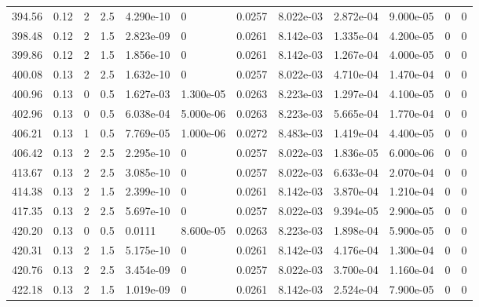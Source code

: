 \documentclass[preview]{standalone}
\begin{document}
{{{\begin{tabular}{L{1.2cm}C{1.2cm} C{0.3cm}C{0.5cm} C{1.4cm}C{1.4cm} C{1.4cm}C{1.4cm} C{1.6cm}C{1.6cm} C{1.6cm}C{1.6cm}}
  394.56  &  0.12  & 2     & 2.5 &  4.290e-10  & 0  &  0.0257&   8.022e-03& 2.872e-04 & 9.000e-05   &  0 & 0  \\ 
  398.48  &  0.12  & 2     & 1.5 &  2.823e-09  & 0  &  0.0261&   8.142e-03& 1.335e-04 & 4.200e-05   &  0 & 0  \\ 
  399.86  &  0.12  & 2     & 1.5 &  1.856e-10  & 0  &  0.0261&   8.142e-03& 1.267e-04 & 4.000e-05   &  0 & 0  \\ 
  400.08  &  0.13  & 2     & 2.5 &  1.632e-10  & 0  &  0.0257&   8.022e-03& 4.710e-04 & 1.470e-04   &  0 & 0  \\ 
  400.96  &  0.13  & 0     & 0.5 &  1.627e-03  & 1.300e-05  &  0.0263&   8.223e-03& 1.297e-04 & 4.100e-05   &  0 & 0  \\ 
  402.96  &  0.13  & 0     & 0.5 &  6.038e-04  & 5.000e-06  &  0.0263&   8.223e-03& 5.665e-04 & 1.770e-04   &  0 & 0  \\ 
  406.21  &  0.13  & 1     & 0.5 &  7.769e-05  & 1.000e-06  &  0.0272&   8.483e-03& 1.419e-04 & 4.400e-05   &  0 & 0  \\ 
  406.42  &  0.13  & 2     & 2.5 &  2.295e-10  & 0  &  0.0257&   8.022e-03& 1.836e-05 & 6.000e-06   &  0 & 0  \\ 
  413.67  &  0.13  & 2     & 2.5 &  3.085e-10  & 0  &  0.0257&   8.022e-03& 6.633e-04 & 2.070e-04   &  0 & 0  \\ 
  414.38  &  0.13  & 2     & 1.5 &  2.399e-10  & 0  &  0.0261&   8.142e-03& 3.870e-04 & 1.210e-04   &  0 & 0  \\ 
  417.35  &  0.13  & 2     & 2.5 &  5.697e-10  & 0  &  0.0257&   8.022e-03& 9.394e-05 & 2.900e-05   &  0 & 0  \\ 
  420.20  &  0.13  & 0     & 0.5 &  0.0111  & 8.600e-05  &  0.0263&   8.223e-03& 1.898e-04 & 5.900e-05   &  0 & 0  \\ 
  420.31  &  0.13  & 2     & 1.5 &  5.175e-10  & 0  &  0.0261&   8.142e-03& 4.176e-04 & 1.300e-04   &  0 & 0  \\ 
  420.76  &  0.13  & 2     & 2.5 &  3.454e-09  & 0  &  0.0257&   8.022e-03& 3.700e-04 & 1.160e-04   &  0 & 0  \\ 
  422.18  &  0.13  & 2     & 1.5 &  1.019e-09  & 0  &  0.0261&   8.142e-03& 2.524e-04 & 7.900e-05   &  0 & 0  \\ 
\hline 
\end{tabular} 

}}}
\end{document}
